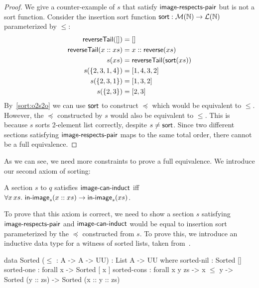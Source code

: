 \begin{proof}
    We give a counter-example of $s$ that satisfy $\operatorname{\mathsf{image-respects-pair}}$ but is not a sort function.
    Consider the insertion sort function $\operatorname{\mathsf{sort}} : \mathcal{M}(\mathbb{N}) \to \mathcal{L}(\mathbb{N})$
    parameterized by $\leq$:
    \begin{align*}
        \operatorname{\mathsf{reverseTail}}([])      & = []                                  \\
        \operatorname{\mathsf{reverseTail}}(x :: xs) & = x :: \operatorname{\mathsf{reverse}}(xs)             \\
        s(xs)                       & = \operatorname{\mathsf{reverseTail}}(\operatorname{\mathsf{sort}}(xs)) \\
        s(\{2,3,1,4\})              & = [1,4,3,2]                           \\
        s(\{2,3,1\})                & = [1, 3, 2]                           \\
        s(\{2,3\})                  & = [2, 3]                              \\
    \end{align*}
    By~\cref{sort:o2s2o} we can use $\operatorname{\mathsf{sort}}$ to construct $\preccurlyeq$ which would be
    equivalent to $\leq$. However, the $\preccurlyeq$ constructed by $s$ would also be equivalent
    to $\leq$. This is because $s$ sorts 2-element list correctly, despite $s \neq \operatorname{\mathsf{sort}}$.
    Since two different sections satisfying $\operatorname{\mathsf{image-respects-pair}}$ maps to the same total order,
    there cannot be a full equivalence.
\end{proof}

As we can see, we need more constraints to prove a full equivalence.
We introduce our second axiom of sorting:
\begin{definition}
    A section $s$ to $q$ satisfies $\operatorname{\mathsf{image-can-induct}}$ iff
    $\forall x\,xs.\,\operatorname{\mathsf{in-image}}_s(x :: xs) \to \operatorname{\mathsf{in-image}}_s(xs)$.
\end{definition}

To prove that this axiom is correct, we need to show a section $s$ satisfying
$\operatorname{\mathsf{image-respects-pair}}$ and $\operatorname{\mathsf{image-can-induct}}$ would be equal to insertion sort parameterized by
the $\preccurlyeq$ constructed from $s$. To prove this, we introduce an inductive data type
for a witness of sorted lists, taken from~\cite{appelVerifiedFunctionalAlgorithms2023}.

\begin{code}
data Sorted ($\leq$ : A -> A -> UU) : List A -> UU where
  sorted-nil : Sorted []
  sorted-one : forall x -> Sorted [ x ]
  sorted-cons : forall x y zs -> x $\leq$ y -> Sorted (y :: zs) -> Sorted (x :: y :: zs)
\end{code}

